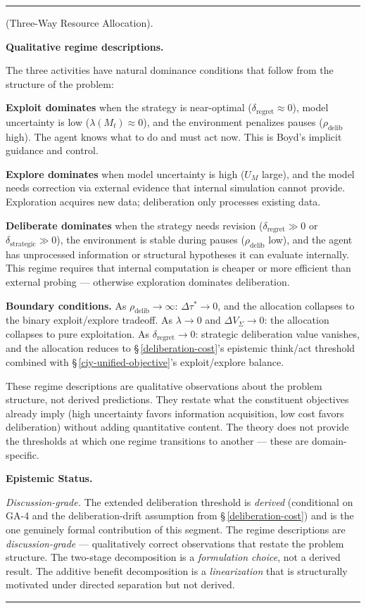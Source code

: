 \documentclass[11pt,oneside]{article}
\newcounter{claim}[section]
\renewcommand{\theclaim}{\thesection.\arabic{claim}}
\newenvironment{segment}[2]{%
  \refstepcounter{claim}%
  \bigskip\noindent\hrule\smallskip
  \noindent{\bfseries #1~\theclaim}\enskip(#2).\par\smallskip
  \noindent\ignorespaces
}{%
  \par\smallskip\noindent\hrule\bigskip
}
\newenvironment{discussion}[1][]{\begin{segment}{Discussion}{#1}}{\end{segment}}
\begin{document}
\begin{discussion}[Three-Way Resource Allocation]
\medskip\noindent\textbf{Qualitative regime descriptions.}



The three activities have natural dominance conditions that follow from the structure of the problem:

\textbf{Exploit dominates} when the strategy is near-optimal ($\delta_{\text{regret}} \approx 0$), model uncertainty is low ($\lambda(M_t) \approx 0$), and the environment penalizes pauses ($\rho_{\text{delib}}$ high). The agent knows what to do and must act now. This is Boyd's implicit guidance and control.

\textbf{Explore dominates} when model uncertainty is high ($U_M$ large), and the model needs correction via external evidence that internal simulation cannot provide. Exploration acquires new data; deliberation only processes existing data.

\textbf{Deliberate dominates} when the strategy needs revision ($\delta_{\text{regret}} \gg 0$ or $\delta_{\text{strategic}} \gg 0$), the environment is stable during pauses ($\rho_{\text{delib}}$ low), and the agent has unprocessed information or structural hypotheses it can evaluate internally. This regime requires that internal computation is cheaper or more efficient than external probing --- otherwise exploration dominates deliberation.

\textbf{Boundary conditions.} As $\rho_{\text{delib}} \to \infty$: $\Delta\tau^* \to 0$, and the allocation collapses to the binary exploit/explore tradeoff. As $\lambda \to 0$ and $\Delta V_\Sigma \to 0$: the allocation collapses to pure exploitation. As $\delta_{\text{regret}} \to 0$: strategic deliberation value vanishes, and the allocation reduces to \S\,\ref{deliberation-cost}'s epistemic think/act threshold combined with \S\,\ref{ciy-unified-objective}'s exploit/explore balance.

These regime descriptions are qualitative observations about the problem structure, not derived predictions. They restate what the constituent objectives already imply (high uncertainty favors information acquisition, low cost favors deliberation) without adding quantitative content. The theory does not provide the thresholds at which one regime transitions to another --- these are domain-specific.


\medskip\noindent\textbf{Epistemic Status.}


\textit{Discussion-grade.} The extended deliberation threshold is \textit{derived} (conditional on GA-4 and the deliberation-drift assumption from \S\,\ref{deliberation-cost}) and is the one genuinely formal contribution of this segment. The regime descriptions are \textit{discussion-grade} --- qualitatively correct observations that restate the problem structure. The two-stage decomposition is a \textit{formulation choice}, not a derived result. The additive benefit decomposition is a \textit{linearization} that is structurally motivated under directed separation but not derived.


\end{discussion}
\end{document}
